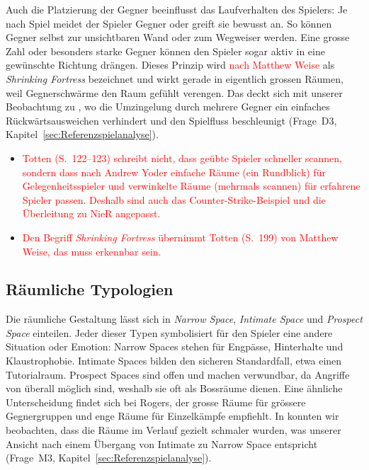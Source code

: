 \documentclass[../Main.tex]{subfiles}
\begin{document}
Auch die Platzierung der Gegner beeinflusst das Laufverhalten des Spielers: Je nach Spiel meidet der Spieler Gegner oder greift sie bewusst an. So können Gegner selbst zur unsichtbaren Wand oder zum Wegweiser werden.\autocite[199]{totten2014architectural} Eine grosse Zahl oder besonders starke Gegner können den Spieler sogar aktiv in eine gewünschte Richtung drängen. Dieses Prinzip wird \textcolor{red}{nach Matthew Weise} als \textit{Shrinking Fortress} bezeichnet und wirkt gerade in eigentlich grossen Räumen, weil Gegnerschwärme den Raum gefühlt verengen.\autocite[199--200]{totten2014architectural} Das deckt sich mit unserer Beobachtung zu , wo die Umzingelung durch mehrere Gegner ein einfaches Rückwärtsausweichen verhindert und den Spielfluss beschleunigt (Frage~D3, Kapitel~\ref{sec:Referenzspielanalyse}).

\begin{itemize}[leftmargin=1.5cm]
    \item \textcolor{red}{Totten (S.~122--123) schreibt nicht, dass geübte Spieler schneller scannen, sondern dass nach Andrew Yoder einfache Räume (ein Rundblick) für Gelegenheitsspieler und verwinkelte Räume (mehrmals scannen) für erfahrene Spieler passen. Deshalb sind auch das Counter-Strike-Beispiel und die Überleitung zu NieR angepasst.}
    \item \textcolor{red}{Den Begriff \textit{Shrinking Fortress} übernimmt Totten (S.~199) von Matthew Weise, das muss erkennbar sein.}
\end{itemize}

\subsection{Räumliche Typologien} \label{sec:Raumtypologien}
Die räumliche Gestaltung lässt sich in \textit{Narrow Space}, \textit{Intimate Space} und \textit{Prospect Space} einteilen. Jeder dieser Typen symbolisiert für den Spieler eine andere Situation oder Emotion: Narrow Spaces stehen für Engpässe, Hinterhalte und Klaustrophobie. Intimate Spaces bilden den sicheren Standardfall, etwa einen Tutorialraum. Prospect Spaces sind offen und machen verwundbar, da Angriffe von überall möglich sind, weshalb sie oft als Bossräume dienen.\autocite[161--168]{totten2014architectural} Eine ähnliche Unterscheidung findet sich bei Rogers, der grosse Räume für grössere Gegnergruppen und enge Räume für Einzelkämpfe empfiehlt.\autocite[245]{rogers2014levelup} In  konnten wir beobachten, dass die Räume im Verlauf gezielt schmaler wurden, was unserer Ansicht nach einem Übergang von Intimate zu Narrow Space entspricht (Frage~M3, Kapitel~\ref{sec:Referenzspielanalyse}).
\end{document}
